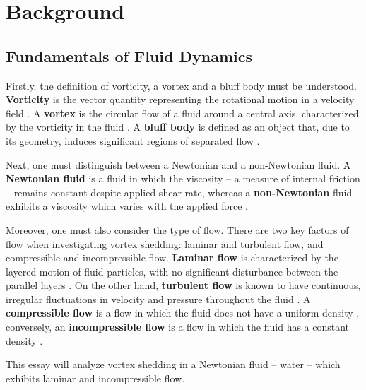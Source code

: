 \section{Background}

\subsection{Fundamentals of Fluid Dynamics}
Firstly, the definition of vorticity, a vortex and a bluff body must be understood. \textbf{Vorticity} is the vector quantity representing the rotational motion in a velocity field \parencite[p.~2500]{holton2003_vorticity}. A \textbf{vortex} is the circular flow of a fluid around a central axis, characterized by the vorticity in the fluid \parencite[p.~390]{nitsche2006_vortex}. A \textbf{bluff body} is defined as an object that, due to its geometry, induces significant regions of separated flow \parencite[p.~561]{navalhydro1997}. 

Next, one must distinguish between a Newtonian and a non-Newtonian fluid. A \textbf{Newtonian fluid} is a fluid in which the viscosity -- a measure of internal friction -- remains constant despite applied shear rate, whereas a \textbf{non-Newtonian} fluid exhibits a viscosity which varies with the applied force \parencite{mohn2024}. 

Moreover, one must also consider the type of flow. There are two key factors of flow when investigating vortex shedding: laminar and turbulent flow, and compressible and incompressible flow. \textbf{Laminar flow} is characterized by the layered motion of fluid particles, with no significant disturbance between the parallel layers \parencite[pp.~40--41]{versteeg2007}. On the other hand, \textbf{turbulent flow} is known to have continuous, irregular fluctuations in velocity and pressure throughout the fluid \parencite[p.~40]{versteeg2007}. A \textbf{compressible flow} is a flow in which the fluid does not have a uniform density \parencite[p.~31]{oran2002}, conversely, an \textbf{incompressible flow} is a flow in which the fluid has a constant density \parencite[p.~12]{versteeg2007}. 

This essay will analyze vortex shedding in a Newtonian fluid – water – which exhibits laminar and incompressible flow.

